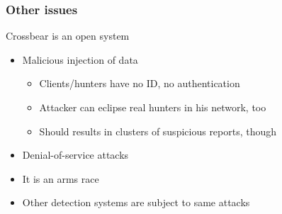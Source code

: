 \begin{frame}
\frametitle{Other issues}
\begin{block}{Crossbear is an open system}
\begin{itemize}
  \item Malicious injection of data
    \begin{itemize}
      \item Clients/hunters have no ID, no authentication
      \item Attacker can eclipse real hunters in his network, too
      \item Should results in clusters of suspicious reports, though
    \end{itemize}
  \item Denial-of-service attacks
  \item It is an arms race
  \item Other detection systems are subject to same attacks
\end{itemize}
\end{block}
\end{frame}
